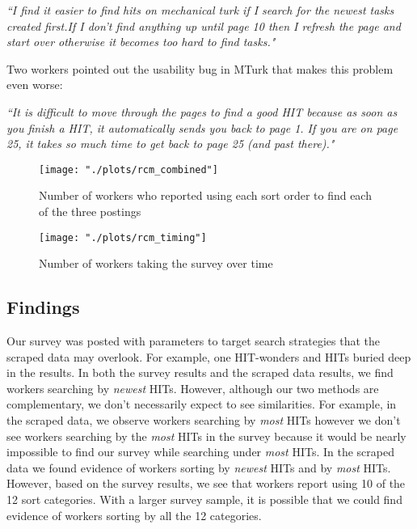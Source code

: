 \documentclass{acm_proc_article-sp}
\begin{document}
{\em ``I find it easier to find hits on mechanical turk if I search for the newest tasks created first.If I don't find anything up until page 10 then I refresh the page and start over otherwise it becomes too hard to find tasks."}

Two workers pointed out the usability bug in MTurk that makes this problem even worse:

{\em ``It is difficult to move through the pages to find a good HIT because as soon as you finish a HIT, it automatically sends you back to page 1. If you are on page 25, it takes so much time to get back to page 25 (and past there)."}


\begin{figure}[htp]
\centering
\texttt{[image: "./plots/rcm\_combined"]}
\caption{Number of workers who reported using each sort order to find
  each of the three postings}
\label{fig:X3}
\end{figure}


\begin{figure}[htp]
\centering
\texttt{[image: "./plots/rcm\_timing"]}
\caption{Number of workers taking the survey over time}
\label{fig:X2}
\end{figure}

%


\subsection{Findings}


Our survey was posted with parameters to target search strategies that the scraped data may overlook.  For example, one HIT-wonders and HITs buried deep in the results.  In both the survey results and the scraped data results, we find
workers searching by {\em newest} HITs.  However, although our two
methods are complementary, we don't necessarily expect to see
similarities.  For example, in the scraped data, we observe workers
searching by {\em most} HITs however we don't see workers searching by
the {\em most} HITs in the survey because it would be nearly
impossible to find our survey while searching under {\em most} HITs.  In the scraped data we found evidence of workers sorting by {\em newest} HITs and by {\em most} HITs.  However, based on the survey
results, we see that workers report using 10 of the 12 sort
categories.  With a larger survey sample, it is possible that we could
find evidence of workers sorting by all the 12 categories.
\end{document}
